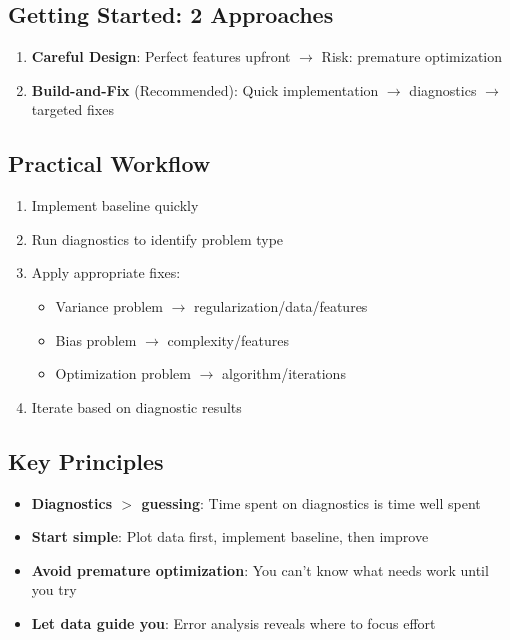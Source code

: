 \documentclass[12pt]{article}
\begin{document}
\subsection*{Getting Started: 2 Approaches}

\begin{enumerate}
\item \textbf{Careful Design}: Perfect features upfront $\rightarrow$ Risk: premature optimization
\item \textbf{Build-and-Fix} (Recommended): Quick implementation $\rightarrow$ diagnostics $\rightarrow$ targeted fixes
\end{enumerate}

\subsection*{Practical Workflow}

\begin{enumerate}
\item Implement baseline quickly
\item Run diagnostics to identify problem type
\item Apply appropriate fixes:
   \begin{itemize}
   \item Variance problem $\rightarrow$ regularization/data/features
   \item Bias problem $\rightarrow$ complexity/features
   \item Optimization problem $\rightarrow$ algorithm/iterations
   \end{itemize}
\item Iterate based on diagnostic results
\end{enumerate}

\subsection*{Key Principles}

\begin{itemize}
\item \textbf{Diagnostics $>$ guessing}: Time spent on diagnostics is time well spent
\item \textbf{Start simple}: Plot data first, implement baseline, then improve
\item \textbf{Avoid premature optimization}: You can't know what needs work until you try
\item \textbf{Let data guide you}: Error analysis reveals where to focus effort
\end{itemize}
\end{document}
